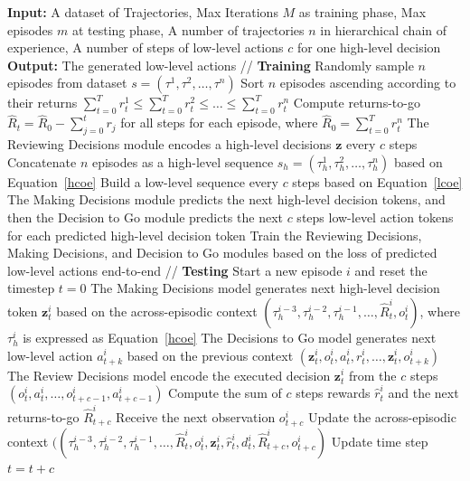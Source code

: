 \begin{algorithm}[h!]
\caption{In-context Decision Transformer.}
\label{IDT algorithm}
\begin{algorithmic}[1]
\STATE \textbf{Input:} A dataset of Trajectories, Max Iterations $M$ as training phase, Max episodes $m$ at testing phase, A number of trajectories $n$ in hierarchical chain of experience, A number of steps of low-level actions $c$ for one high-level decision
\STATE \textbf{Output:} The generated low-level actions
\STATE // \textbf{Training}
    \STATE Randomly sample $n$ episodes from dataset $s=(\tau^{1},\tau^{2},\dots,\tau^{n})$
    \STATE Sort $n$ episodes ascending according to their returns $\sum_{t=0}^T{r_t^1}\leq\sum_{t=0}^T{r_t^2}\leq\dots\leq\sum_{t=0}^T{r_t^n}$
    \STATE Compute returns-to-go $\hat{R}_t=\hat{R}_0-\sum_{j=0}^tr_j$ for all steps for each episode, where $\hat{R}_0=\sum_{t=0}^T{r_t^n}$
    \STATE The Reviewing Decisions module encodes a high-level decisions $\textbf{z}$ every $c$ steps
    \STATE Concatenate $n$ episodes as a high-level sequence $s_h=(\tau_h^{1},\tau_h^{2},\dots,\tau_h^{n})$ based on Equation~\eqref{hcoe}
    \STATE Build a low-level sequence every $c$ steps based on Equation~\eqref{lcoe}
    \STATE The Making Decisions module predicts the next high-level decision tokens, and then the Decision to Go module predicts the next $c$ steps low-level action tokens for each predicted high-level decision token
    \STATE Train the Reviewing Decisions, Making Decisions, and Decision to Go modules based on the loss of predicted low-level actions end-to-end    
\ENDFOR
\STATE // \textbf{Testing}
    \STATE Start a new episode $i$ and reset the timestep $t=0$
        \STATE The Making Decisions model generates next high-level decision token $\textbf{z}_t^i$ based on the across-episodic context $(\tau_h^{i-3},\tau_h^{i-2},\tau_h^{i-1},\dots,\hat{R}_t^i,o_t^i)$, where $\tau_h^{i}$ is expressed as Equation~\eqref{hcoe}
            \STATE The Decisions to Go model generates next low-level action $a_{t+k}^i$ based on the previous context $(\textbf{z}_t^i,o_t^i,a_t^i,r_t^i,\dots,\textbf{z}_{t}^i,o_{t+k}^i)$
        \ENDFOR
        \STATE The Review Decisions model encode the executed decision $\textbf{z}_t^i$ from the $c$ steps $(o_t^i,a_t^i,\dots,o_{t+c-1}^i,a_{t+c-1}^i)$
        \STATE Compute the sum of $c$ steps rewards $\hat{r}_t^i$ and the next returns-to-go $\hat{R}_{t+c}^i$
        \STATE Receive the next observation $o_{t+c}^i$
        \STATE Update the across-episodic context $((\tau_h^{i-3},\tau_h^{i-2},\tau_h^{i-1},\dots,\hat{R}_t^i,o_t^i,\textbf{z}_t^i,\hat{r}_t^i,d_t^i,\hat{R}_{t+c}^i,o_{t+c}^i)$
        \STATE Update time step $t = t+c$
    \ENDWHILE
\ENDFOR
\end{algorithmic}
\end{algorithm}

